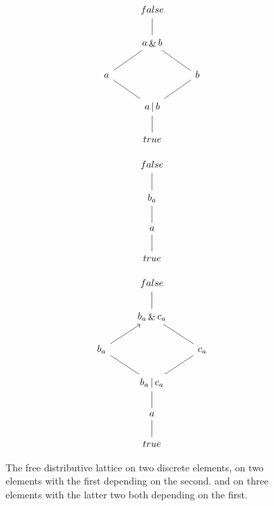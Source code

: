 \documentclass[hoptionsi,review,screen,format=sigconf]{acmart}
\theoremstyle{definition}
\newcommand{\band}{\mathop{\&}}
\newcommand{\bor}{\mathop{|}}
\begin{document}
\begin{figure}
\begin{minipage}[c]{0.3\textwidth}
\begin{equation*}
\begin{tikzcd}
             & false                            &              \\
             & a \band b \arrow[u, no head]              &              \\
a \arrow[ru, no head] &                                 & b \arrow[lu, no head] \\
             & a \bor b \arrow[lu, no head] \arrow[ru, no head] &              \\
             & true \arrow[u, no head]                 &             
\end{tikzcd}
\end{equation*}
\end{minipage}
\begin{minipage}[c]{0.3\textwidth}
\begin{equation*}
\begin{tikzcd}
false                    \\
b_{a} \arrow[u, no head] \\
a \arrow[u, no head]     \\
true \arrow[u, no head] 
\end{tikzcd}
\end{equation*}
\end{minipage}
\begin{minipage}[c]{0.3\textwidth}
\begin{equation*}
\begin{tikzcd}
               & false                                                &                         \\
               & b_a \band c_a \arrow[u, no head]                     &                         \\
b_a \arrow[ru] &                                                      & c_a \arrow[lu, no head] \\
               & b_a \bor c_a \arrow[lu, no head] \arrow[ru, no head] &                         \\
               & a \arrow[u, no head]                                 &                         \\
               & true \arrow[u, no head]                              &                        
\end{tikzcd}
\end{equation*}
\end{minipage}
\caption{The free distributive lattice on two discrete elements,  on two elements with the first depending on the second. and on three elements with the latter two both depending on the first.}
\label{Fig5}
\end{figure}
\end{document}
